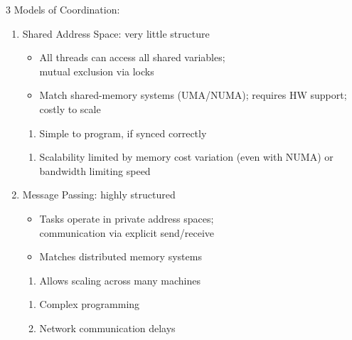 \documentclass[12pt, a4paper]{article}
\begin{document}
\begin{multicols*}{3}
Models of Coordination:
\begin{enumerate}[\roman*.]
  \item Shared Address Space: very little structure
    \begin{itemize}[leftmargin=*]\vspace{2pt}
      \item All threads can access all shared variables;\\mutual exclusion via locks
      \item Match shared-memory systems (UMA/NUMA); requires HW support; costly to scale 
    \end{itemize}
    \begin{enumerate}[leftmargin=*, label=$+$]\vspace{5pt}
      \item Simple to program, if synced correctly 
    \end{enumerate}
    \begin{enumerate}[leftmargin=*, label=$-$]\vspace{5pt}
      \item Scalability limited by memory cost variation (even with NUMA) or bandwidth limiting speed
    \end{enumerate}
  \item Message Passing: highly structured
    \begin{itemize}[leftmargin=*]\vspace{2pt}
      \item Tasks operate in private address spaces;\\communication via explicit send/receive 
      \item Matches distributed memory systems
    \end{itemize}
    \begin{enumerate}[leftmargin=*, label=$+$]\vspace{5pt}
      \item Allows scaling across many machines 
    \end{enumerate}
    \begin{enumerate}[leftmargin=*, label=$-$]\vspace{5pt}
      \item Complex programming  
      \item Network communication delays 
    \end{enumerate}
\end{enumerate}

\colbreak


\end{multicols*}
\end{document}
